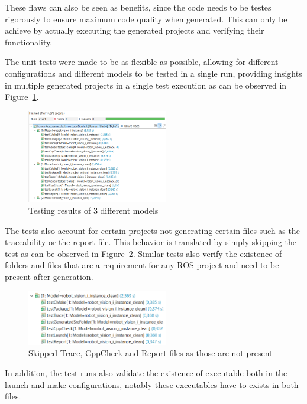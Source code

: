 These flaws can also be seen as benefits, since the code needs to be testes rigorously to ensure maximum code quality when generated. This can only be achieve by actually executing the generated projects and verifying their functionality.

The unit tests were made to be as flexible as possible, allowing for different configurations and different models to be tested in a single run, providing insights in multiple generated projects in a single test execution as can be observed in Figure~\ref{fig:testingResults1}.

\begin{figure}[htbp]
	\centering
	\includegraphics[width=0.55\textwidth]{testingResults1.png}
	\caption{Testing results of 3 different models}
	\label{fig:testingResults1}
\end{figure}

The tests also account for certain projects not generating certain files such as the traceability or the report file. This behavior is translated by simply skipping the test as can be observed in Figure~\ref{fig:testingResultsSkip1}. Similar tests also verify the existence of folders and files that are a requirement for any \gls{ROS} project and need to be present after generation.

\begin{figure}[htbp]
	\centering
	\includegraphics[width=0.55\textwidth]{testingResultsSkip1.png}
	\caption{Skipped Trace, CppCheck and Report files as those are not present}
	\label{fig:testingResultsSkip1}
\end{figure}

In addition, the test runs also validate the existence of executable both in the launch and make configurations, notably these executables have to exists in both files. 

